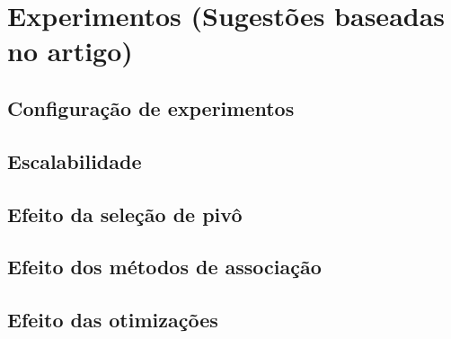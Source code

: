 \chapter{Experimentos (Sugestões baseadas no artigo)}
\label{cap:cap3}

\section{Configuração de experimentos}
\section{Escalabilidade}
\section{Efeito da seleção de pivô}
\section{Efeito dos métodos de associação}
\section{Efeito das otimizações}

